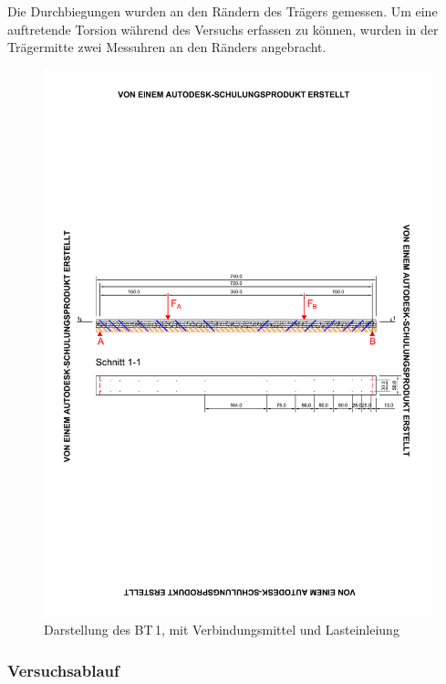   Die Durchbiegungen wurden an den Rändern des Trägers gemessen. 
Um eine auftretende Torsion während des Versuchs erfassen zu können, wurden in der Trägermitte zwei Messuhren an den Ränders angebracht.


\begin{figure}[h!]
\begin{center}
\includegraphics[scale =0.9,trim= 1.5cm 10cm 1.5cm 10cm, clip=true]{Auswertung/1versuch/BT1.pdf}
\caption{Darstellung des BT\,1, mit Verbindungsmittel und Lasteinleiung}
\label{1versuch}
\end{center}
\end{figure}

\subsubsection{Versuchsablauf}

